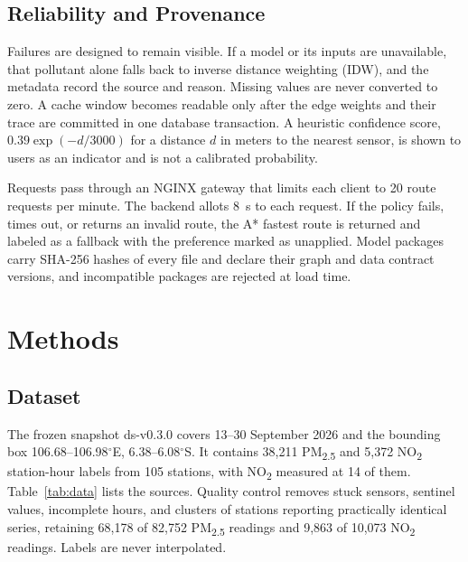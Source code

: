 \documentclass[conference]{IEEEtran}
\newcommand{\pmtf}{PM\textsubscript{2.5}}
\newcommand{\notwo}{NO\textsubscript{2}}
\begin{document}
\subsection{Reliability and Provenance}

Failures are designed to remain visible. If a model or its inputs are unavailable, that pollutant alone falls back to inverse distance weighting (IDW), and the metadata record the source and reason. Missing values are never converted to zero. A cache window becomes readable only after the edge weights and their trace are committed in one database transaction. A heuristic confidence score, $0.39\exp(-d/3000)$ for a distance $d$ in meters to the nearest sensor, is shown to users as an indicator and is not a calibrated probability.

Requests pass through an NGINX gateway that limits each client to 20 route requests per minute. The backend allots 8~s to each request. If the policy fails, times out, or returns an invalid route, the A* fastest route is returned and labeled as a fallback with the preference marked as unapplied. Model packages carry SHA-256 hashes of every file and declare their graph and data contract versions, and incompatible packages are rejected at load time.

\section{Methods}

\subsection{Dataset}

The frozen snapshot ds-v0.3.0 covers 13--30 September 2026 and the bounding box 106.68--106.98$^\circ$E, 6.38--6.08$^\circ$S. It contains 38,211 \pmtf{} and 5,372 \notwo{} station-hour labels from 105 stations, with \notwo{} measured at 14 of them. Table~\ref{tab:data} lists the sources. Quality control removes stuck sensors, sentinel values, incomplete hours, and clusters of stations reporting practically identical series, retaining 68,178 of 82,752 \pmtf{} readings and 9,863 of 10,073 \notwo{} readings. Labels are never interpolated.
\end{document}
